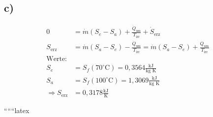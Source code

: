 

\subsection*{c)}
\begin{align*}
0 &= \dot{m} (S_e - S_a) + \frac{\dot{Q}_\text{um}}{T_\text{irr}} + \dot{S}_\text{erz} \\
S_\text{erz} &= \dot{m} (S_a - S_e) - \frac{\dot{Q}_\text{um}}{T_\text{irr}} = \dot{m} (S_a - S_e) + \frac{\dot{Q}_\text{um}}{T_\text{irr}} \\
\text{Werte:} \\
S_e &= S_f (70^\circ \text{C}) = 0,3564 \frac{\text{kJ}}{\text{kg K}} \\
S_a &= S_f (100^\circ \text{C}) = 1,3069 \frac{\text{kJ}}{\text{kg K}} \\
\Rightarrow S_\text{erz} &= 0,3178 \frac{\text{kJ}}{\text{K}}
\end{align*}

``````latex
